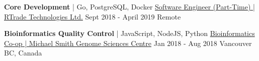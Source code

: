 \begin{cventries}
  \cventry
    {\textbf{Core Development} | Go, PostgreSQL, Docker} %
    {\href{https://bobheadxi.dev/experience/rtrade}{Software Engineer (Part-Time) | RTrade Technologies Ltd.}} %
    {Sept 2018 - April 2019} %
    {Remote} %
    {
    }

\vspace{-0.3cm}
  \cventry
    {\textbf{Bioinformatics Quality Control} | JavaScript, NodeJS, Python} %
    {\href{https://bobheadxi.dev/experience/bcgsc}{Bioinformatics Co-op | Michael Smith Genome Sciences Centre}} %
    {Jan 2018 - Aug 2018} %
    {Vancouver BC, Canada} %
    {
    }

\vspace{-0.3cm}
\end{cventries}
